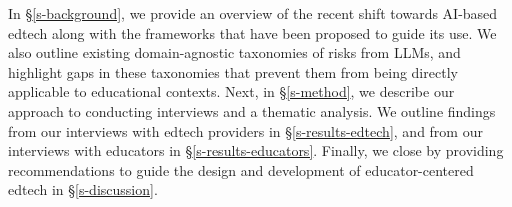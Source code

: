 In \S\ref{s-background}, we provide an overview of the recent shift towards AI-based edtech along with the frameworks that have been proposed to guide its use. We also outline existing domain-agnostic taxonomies of risks from LLMs, and highlight gaps in these taxonomies that prevent them from being directly applicable to educational contexts. Next, in \S\ref{s-method}, we describe our approach to conducting interviews and a thematic analysis. We outline findings from our interviews with edtech providers in \S\ref{s-results-edtech}, and from our interviews with educators in \S\ref{s-results-educators}. Finally, we close by providing recommendations to guide the design and development of educator-centered edtech in \S\ref{s-discussion}. 
